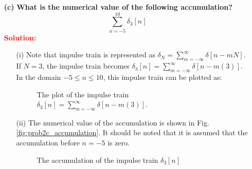\documentclass[a4paper, 12pt]{article}
\begin{document}
\begin{itemize}
\begin{itemize}
\pagebreak
\item[\textbf{(c)}]{\textbf{What is the numerical value of the following accumulation?}}
\begin{equation}
\sum_{n = -5}^{10} \delta_{3}[n]
\end{equation}
\textcolor{red}{\textbf{Solution:}}
\begin{itemize}
\item[(i)]{Note that impulse train is represented as $\delta_{N} = \sum_{m = -\infty}^{\infty}\delta[n - mN]$. If $N = 3$, the impulse train becomes $\boxed{\delta_{3}[n] = \sum_{m = -\infty}^{\infty}\delta[n - m(3)]}$. In the domain $-5 \leq n \leq 10$, this impulse train can be plotted as:}
\begin{figure}[h!]
\caption{\label{fig:prob2c_impulseTrain} The plot of the impulse train $\delta_{3}[n] = \sum_{m=-\infty}^{\infty}{\delta[n - m(3)]}$.}
\end{figure}
\item[(ii)]{The numerical value of the accumulation is shown in Fig. \eqref{fig:prob2c_accumulation}. It should be noted that it is assumed that the accumulation before $n = -5$ is zero.}
\begin{figure}[h!]
\caption{\label{fig:prob2c_accumulation}The accumulation of the impulse train $\delta_{3}[n]$}
\end{figure}
\end{itemize}


\end{itemize}
\end{itemize}
\end{document}
